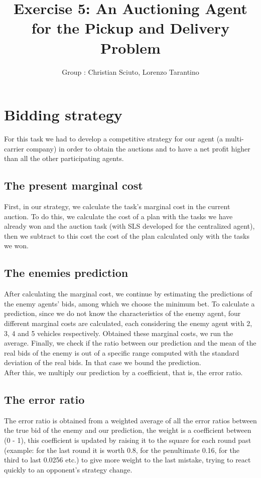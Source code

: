 \documentclass[11pt]{article}
\title{\bf Exercise 5: An Auctioning Agent for the Pickup and Delivery Problem}
\author{Group \textnumero 15: Christian Sciuto, Lorenzo Tarantino}
\begin{document}
\maketitle

\section{Bidding strategy}

For this task we had to develop a competitive strategy for our agent (a multi-carrier company) in order to obtain the auctions and to have a net profit higher than all the other participating agents.

\subsection{The present marginal cost}

First, in our strategy, we calculate the task's marginal cost in the current auction. To do this, we calculate the cost of a plan with the tasks we have already won and the auction task (with SLS developed for the centralized agent), then we subtract to this cost the cost of the plan calculated only with the tasks we won.

\subsection{The enemies prediction}
After calculating the marginal cost, we continue by estimating the predictions of the enemy agents' bids, among which we choose the minimum bet. To calculate a prediction, since we do not know the characteristics of the enemy agent, four different marginal costs are calculated, each considering the enemy agent with 2, 3, 4 and 5 vehicles respectively. Obtained these marginal costs, we run the average. Finally, we check if the ratio between our prediction and the mean of the real bids of the enemy is out of a specific range computed with the standard deviation of the real bids. In that case we bound the prediction.
\\
After this, we multiply our prediction by a coefficient, that is, the error ratio.

\subsection{The error ratio}
The error ratio is obtained from a weighted average of all the error ratios between the true bid of the enemy and our prediction, the weight is a coefficient between (0 - 1), this coefficient is updated by raising it to the square for each round past (example: for the last round it is worth 0.8, for the penultimate 0.16, for the third to last 0.0256 etc.) to give more weight to the last mistake, trying to react quickly to an opponent's strategy change.
\end{document}
